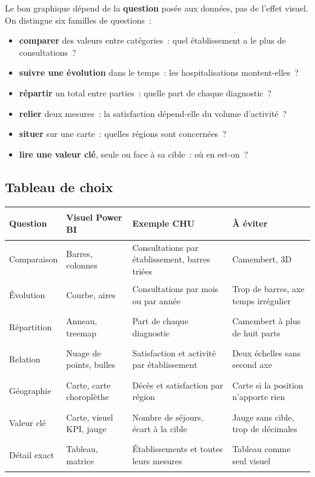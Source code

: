 \noindent Le bon graphique dépend de la \textbf{question} posée aux données, pas de l'effet visuel. On distingue six familles de questions~:
\begin{itemize}
	\item \textbf{comparer} des valeurs entre catégories~: quel établissement a le plus de consultations~?
	\item \textbf{suivre une évolution} dans le temps~: les hospitalisations montent-elles~?
	\item \textbf{répartir} un total entre parties~: quelle part de chaque diagnostic~?
	\item \textbf{relier} deux mesures~: la satisfaction dépend-elle du volume d'activité~?
	\item \textbf{situer} sur une carte~: quelles régions sont concernées~?
	\item \textbf{lire une valeur clé}, seule ou face à sa cible~: où en est-on~?
\end{itemize}

\subsection{Tableau de choix}

\begin{center}
\small
\begin{tabularx}{\textwidth}{>{\bfseries\raggedright\arraybackslash}p{2.5cm} >{\raggedright\arraybackslash}p{3.4cm} >{\raggedright\arraybackslash}X >{\raggedright\arraybackslash}X}
\toprule
Question & Visuel Power BI & Exemple CHU & À éviter \\
\midrule
Comparaison & Barres, colonnes & Consultations par établissement, barres triées & Camembert, 3D \\
Évolution & Courbe, aires & Consultations par mois ou par année & Trop de barres, axe temps irrégulier \\
Répartition & Anneau, treemap & Part de chaque diagnostic & Camembert à plus de huit parts \\
Relation & Nuage de points, bulles & Satisfaction et activité par établissement & Deux échelles sans second axe \\
Géographie & Carte, carte choroplèthe & Décès et satisfaction par région & Carte si la position n'apporte rien \\
Valeur clé & Carte, visuel KPI, jauge & Nombre de séjours, écart à la cible & Jauge sans cible, trop de décimales \\
Détail exact & Tableau, matrice & Établissements et toutes leurs mesures & Tableau comme seul visuel \\
\bottomrule
\end{tabularx}
\end{center}

